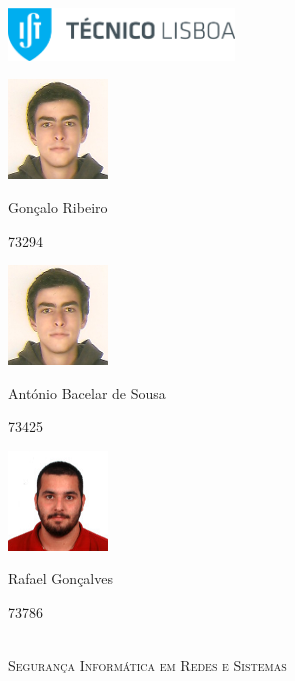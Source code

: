 \begin{titlepage}

	\begin{center}

		\includegraphics[width=6cm]{./title}\\[1cm]
		\begin{minipage}{0.25\textwidth}
			\centering
                        \includegraphics[width=0.1\paperwidth]{ist173425}

			Gonçalo Ribeiro

                        73294
		\end{minipage}
		\begin{minipage}{0.4\textwidth}
                        \centering
			\includegraphics[width=0.1\paperwidth]{ist173425}

			António Bacelar de Sousa

                        73425
		\end{minipage}
		\begin{minipage}{0.25\textwidth}
                        \centering
			\includegraphics[width=0.1\paperwidth]{ist173786}

			Rafael Gonçalves

                        73786
		\end{minipage}\\[2cm]

		\textsc{\LARGE Segurança Informática em Redes e Sistemas}\\[1.5cm]


\end{center}
\end{titlepage}
